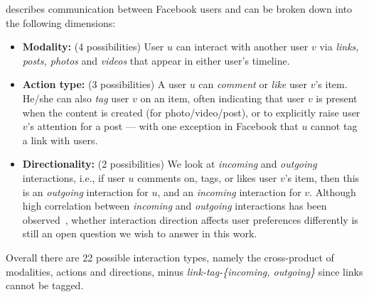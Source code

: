 \vspace{2mm}

 describes communication between Facebook users
and can be broken down into the following dimensions:

\begin{itemize}

\item \textbf{Modality:} (4 possibilities) User $u$ can interact with
  another user $v$ via \textit{links, posts, photos} and
  \textit{videos} that appear in either user's timeline.

\item \textbf{Action type:} (3 possibilities) A user $u$ can
  \textit{comment} or \textit{like} user $v$'s item. He/she can also
  \textit{tag} user $v$ on an item, often indicating that user $v$ is
  present when the content is created (for photo/video/post), or to
  explicitly raise user $v$'s attention for a post --- with one
  exception in Facebook that $u$ cannot tag a link with users.

\item \textbf{Directionality:} (2 possibilities) We look at
  \textit{incoming} and \textit{outgoing} interactions, i.e., if user
  $u$ comments on, tags, or likes user $v$'s item, then this is an
  \textit{outgoing} interaction for $u$, and an \textit{incoming} 
  interaction for $v$.
  Although high correlation between \textit{incoming} and
  \textit{outgoing} interactions has been
  observed~\cite{saez2011high}, whether interaction direction affects
  user preferences differently is still an open question we wish to
  answer in this work.

\end{itemize}

Overall there are 22 possible interaction types, namely the cross-product of modalities, actions and directions, minus {\em link-tag-\{incoming, outgoing\}} since links cannot be tagged.

\vspace{2mm}

